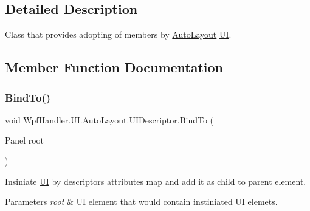 \subsection{Detailed Description}
Class that provides adopting of members by \mbox{\hyperlink{namespace_wpf_handler_1_1_u_i_1_1_auto_layout}{Auto\+Layout}} \mbox{\hyperlink{namespace_wpf_handler_1_1_u_i}{UI}}. 



\subsection{Member Function Documentation}
\mbox{\label{class_wpf_handler_1_1_u_i_1_1_auto_layout_1_1_u_i_descriptor_af342f6e3f3a3fc86eed3e998bbce1cc5}} 
\subsubsection{\texorpdfstring{Bind\+To()}{BindTo()}}
{\footnotesize\ttfamily void Wpf\+Handler.\+U\+I.\+Auto\+Layout.\+U\+I\+Descriptor.\+Bind\+To (\begin{DoxyParamCaption}\item[{Panel}]{root }\end{DoxyParamCaption})}



Insiniate \mbox{\hyperlink{namespace_wpf_handler_1_1_u_i}{UI}} by descriptor\textquotesingle{}s attributes map and add it as child to parent element. 


\begin{DoxyParams}{Parameters}
{\em root} & \mbox{\hyperlink{namespace_wpf_handler_1_1_u_i}{UI}} element that would contain instiniated \mbox{\hyperlink{namespace_wpf_handler_1_1_u_i}{UI}} elemets.\\
\hline
\end{DoxyParams}
\mbox{\label{class_wpf_handler_1_1_u_i_1_1_auto_layout_1_1_u_i_descriptor_a2862ba93b12a9698b88795d41c672f97}} 
